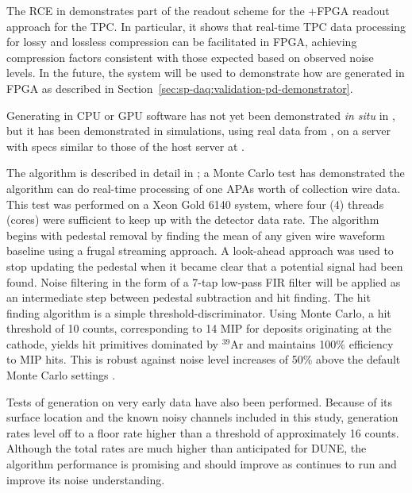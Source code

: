 \label{sec:sp-daq:validation-pdune-rce}

The RCE  in  demonstrates part of the readout scheme for
the   +FPGA readout approach for the TPC. In particular, it
shows that real-time TPC data processing for lossy
and lossless compression can be facilitated in FPGA, achieving
compression factors consistent with those expected based on observed
 noise levels. In the future, the system will be used
to demonstrate how  are generated in FPGA as
described in Section~\ref{sec:sp-daq:validation-pd-demonstrator}.

\label{sec:sp-daq:validation-software-trigger-primitives}

Generating  in CPU or GPU software has not
yet been demonstrated \textit{in situ} in , but it has been
demonstrated in simulations, using real data from , on a
server with specs similar to those 
of the    host server at .

The algorithm is described in detail in \cite{docid-11236}; a Monte Carlo test has demonstrated the algorithm can do real-time processing of one APAs worth
of collection wire data. This test was performed on a Xeon Gold 6140
system, where four (4) threads (cores) were sufficient to keep
up with the detector data rate. The algorithm begins with pedestal removal by
finding the mean of any given wire waveform baseline using a frugal
streaming approach. A look-ahead approach was used to stop
updating the pedestal when it became clear that a potential signal
had been found. Noise filtering in the form of a 7-tap low-pass FIR
filter will be applied as an intermediate step
between pedestal subtraction and hit finding. The hit finding
algorithm is a simple threshold-discriminator. Using Monte Carlo, a hit
threshold of 10  counts, corresponding to 1\/4 MIP for deposits originating at the cathode, yields hit primitives dominated by
$^{39}$Ar and maintains 100\% efficiency to MIP hits. This is robust against noise level 
increases of 50\% above the default  Monte Carlo settings \cite{docid-11275}. 

Tests of  generation on very early  data have also been
performed. Because of its surface
location and the known noisy channels included in this study,
  generation rates level off to a floor rate higher than a threshold
of approximately 16  counts. Although the total rates are much higher than
anticipated for DUNE, the algorithm performance is promising and should improve as  continues
to run and improve its noise understanding.

